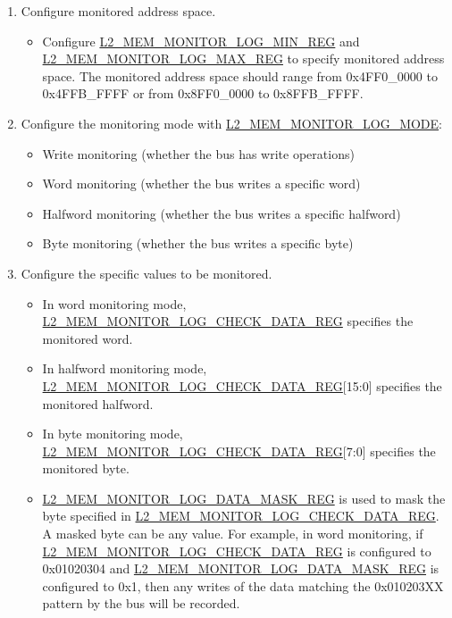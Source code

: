 \documentclass[main\_\_EN.tex]{subfiles}
\begin{document}
\begin{enumerate}

\item Configure monitored address space.
      \begin{itemize}
         \item Configure \hyperref[regdesc:L2MEMMONITORLOGMINREG]{L2\_MEM\_MONITOR\_LOG\_MIN\_REG} and \hyperref[regdesc:L2MEMMONITORLOGMAXREG]{L2\_MEM\_MONITOR\_LOG\_MAX\_REG} to specify monitored address space. The monitored address space should range from 0x4FF0\_0000 to 0x4FFB\_FFFF or from 0x8FF0\_0000 to 0x8FFB\_FFFF.
      \end{itemize}

\item Configure the monitoring mode with \hyperref[fielddesc:L2MEMMONITORLOGMODE]{L2\_MEM\_MONITOR\_LOG\_MODE}:
       \begin{itemize}
           \item Write monitoring (whether the bus has write operations)
           \item Word monitoring (whether the bus writes a specific word)
           \item Halfword monitoring (whether the bus writes a specific halfword)
           \item Byte monitoring (whether the bus writes a specific byte)
       \end{itemize}

\item Configure the specific values to be monitored.
       \begin{itemize}
            \item In word monitoring mode, \hyperref[regdesc:L2MEMMONITORLOGCHECKDATAREG]{L2\_MEM\_MONITOR\_LOG\_CHECK\_DATA\_REG} specifies the monitored word.
            \item In halfword monitoring mode, \hyperref[regdesc:L2MEMMONITORLOGCHECKDATAREG]{L2\_MEM\_MONITOR\_LOG\_CHECK\_DATA\_REG}[15:0] specifies the monitored halfword.
            \item In byte monitoring mode, \hyperref[regdesc:L2MEMMONITORLOGCHECKDATAREG]{L2\_MEM\_MONITOR\_LOG\_CHECK\_DATA\_REG}[7:0] specifies the monitored byte.
            \item \hyperref[regdesc:L2MEMMONITORLOGDATAMASKREG]{L2\_MEM\_MONITOR\_LOG\_DATA\_MASK\_REG} is used to mask the byte specified in \hyperref[regdesc:L2MEMMONITORLOGCHECKDATAREG]{L2\_MEM\_MONITOR\_LOG\_CHECK\_DATA\_REG}. A masked byte can be any value. For example, in word monitoring, if \hyperref[regdesc:L2MEMMONITORLOGCHECKDATAREG]{L2\_MEM\_MONITOR\_LOG\_CHECK\_DATA\_REG} is configured to 0x01020304 and \hyperref[regdesc:L2MEMMONITORLOGDATAMASKREG]{L2\_MEM\_MONITOR\_LOG\_DATA\_MASK\_REG} is configured to 0x1, then any writes of the data matching the 0x010203XX pattern by the bus will be recorded.
       \end{itemize}


\end{enumerate}
\end{document}
